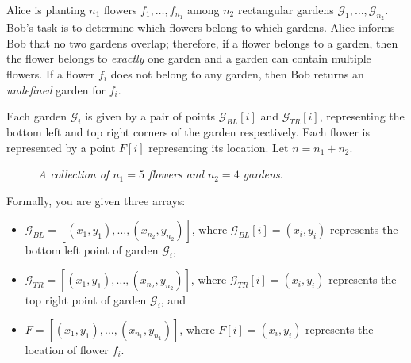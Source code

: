 \documentclass{article}
\begin{document}
\begin{question}
Alice is planting $n_1$ flowers $f_1, \dots, f_{n_1}$ among $n_2$ rectangular gardens $\mathcal G_1, \dots, \mathcal G_{n_2}$. Bob's task is to determine which flowers belong to which gardens. Alice informs Bob that no two gardens overlap; therefore, if a flower belongs to a garden, then the flower belongs to {\em exactly} one garden and a garden can contain multiple flowers. If a flower $f_i$ does not belong to any garden, then Bob returns an {\em undefined} garden for $f_i$.

Each garden $\mathcal G_i$ is given by a pair of points $\mathcal G_{BL}[i]$ and $\mathcal G_{TR}[i]$, representing the bottom left and top right corners of the garden respectively. Each flower is represented by a point $F[i]$ representing its location. Let $n = n_1 + n_2$.

\begin{figure}[H]
    \centering
    \caption{{\em A collection of $n_1 = 5$ flowers and $n_2 = 4$ gardens}.}
\end{figure}

Formally, you are given three arrays:
\begin{itemize}
    \item $\mathcal G_{BL} = [(x_1, y_1), \dots, (x_{n_2}, y_{n_2})]$, where $\mathcal G_{BL}[i] = (x_i, y_i)$ represents the bottom left point of garden $\mathcal G_i$,
    \item $\mathcal G_{TR} = [(x_1, y_1), \dots, (x_{n_2}, y_{n_2})]$, where $\mathcal G_{TR}[i] = (x_i, y_i)$ represents the top right point of garden $\mathcal G_i$, and
    \item $F = [(x_1, y_1), \dots, (x_{n_1}, y_{n_1})]$, where $F[i] = (x_i, y_i)$ represents the location of flower $f_i$.
\end{itemize}


\end{question}
\end{document}
